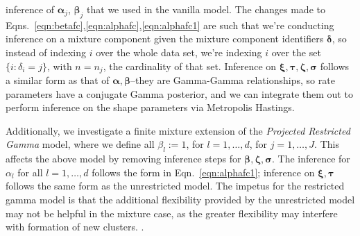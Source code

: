   inference of $\bm{ \alpha}_j$, $\bm{ \beta}_j$ that we used in the vanilla model.  The changes made
  to Eqns.~\ref{eqn:betafc},\ref{eqn:alphafc},\ref{eqn:alphafc1} are such that we're conducting inference
  on a mixture component given the mixture component identifiers $\bm{ \delta}$, so instead of indexing
  $i$ over the whole data set, we're indexing $i$ over the set $\{i :\delta_i = j\}$, with $n = n_j$,
  the cardinality of that set. Inference on $\bm{ \xi,\tau,\zeta,\sigma}$ follows a similar form as
  that of $\bm{ \alpha,\beta}$--they are Gamma-Gamma relationships, so rate parameters have a conjugate
  Gamma posterior, and we can integrate them out to perform inference on the shape parameters via
  Metropolis Hastings.

Additionally, we investigate a finite mixture extension of the \emph{Projected Restricted Gamma} model,
  where we define all $\beta_l := 1$, for $l = 1,\ldots,d$, for $j = 1,\ldots,J$.  This affects the above
  model by removing inference steps for $\bm{ \beta},\bm{ \zeta},\bm{ \sigma}$.  The inference for
  $\alpha_l$ for all $l = 1,\ldots,d$ follows the form in Eqn.~\ref{eqn:alphafc1}; inference on
  $\bm{ \xi,\tau}$ follows the same form as the unrestricted model.  The impetus for the restricted
  gamma model is that the additional flexibility provided by the unrestricted model may not be helpful
  in the mixture case, as the greater flexibility may interfere with formation of new clusters.
  .

